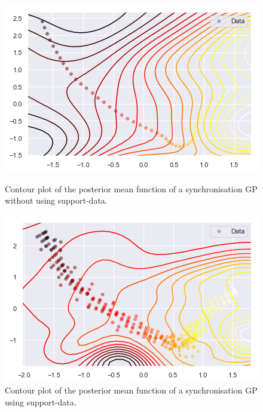 \begin{figure}[H]
  \begin{minipage}{.46\textwidth}
    \includegraphics[scale=0.48,width=\textwidth]{figures/heat-without-support-data.png}
    \caption{Contour plot of the posterior mean function of a
      synchronisation GP without using support-data.}
    \label{fig:heightmap-without-support}
  \end{minipage}
  \hspace{5pt}
  \begin{minipage}{.46\textwidth}
    \includegraphics[scale=0.5,width=\textwidth]{figures/heat-with-support-data.png}
    \caption{Contour plot of the posterior mean function of a
      synchronisation GP using support-data.}
    \label{fig:heightmap-with-support}
  \end{minipage}
\end{figure}

